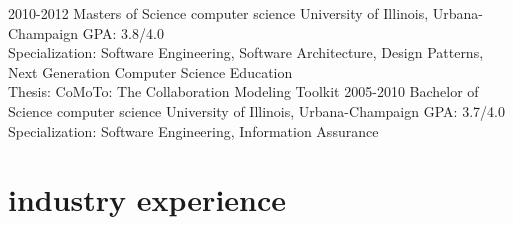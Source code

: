 \documentclass['print']{friggeri-cv} %
\begin{document}
\begin{entrylist}
\entry
{2010-2012}
{Masters of Science {\normalfont computer science}}
{University of Illinois, Urbana-Champaign}
{GPA: 3.8/4.0 \\
Specialization: Software Engineering, Software Architecture, Design Patterns, Next Generation Computer Science Education \\ 
Thesis: CoMoTo: The Collaboration Modeling Toolkit }
\entry
{2005-2010}
{Bachelor of Science {\normalfont computer science}}
{University of Illinois, Urbana-Champaign}
{GPA: 3.7/4.0 \\
Specialization: Software Engineering, Information Assurance}
\end{entrylist}


\section{industry experience}
\end{document}
